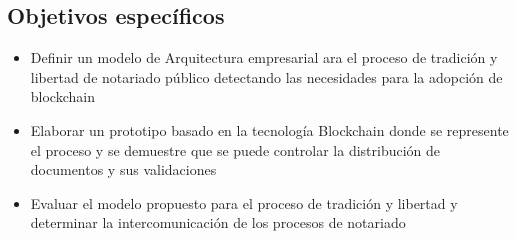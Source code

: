 \subsection{Objetivos específicos}
\begin{itemize}

\item Definir un modelo de Arquitectura empresarial ara el proceso de tradición y libertad de notariado público detectando las necesidades para la adopción de blockchain

\item Elaborar un prototipo basado en la tecnología Blockchain donde se represente el proceso y se demuestre que se puede controlar la distribución de documentos y sus validaciones

\item Evaluar el modelo propuesto para el proceso de tradición y libertad y determinar la intercomunicación de los procesos de notariado
\end{itemize}




